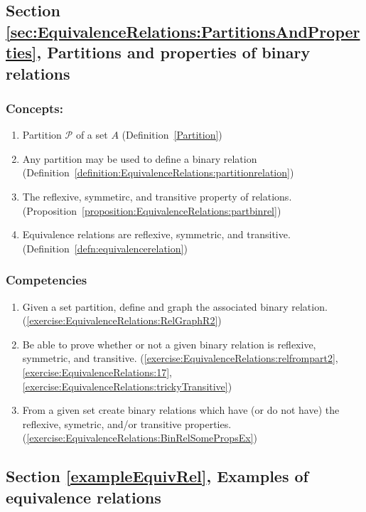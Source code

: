 \subsection*{Section \ref{sec:EquivalenceRelations:PartitionsAndProperties}, Partitions and properties of binary relations}
\subsubsection*{Concepts:}
\begin{enumerate}
\item 
Partition $\mathcal{P}$ of a set $A$ (Definition~\ref{Partition})
\item 
Any partition may be used to define a binary relation (Definition~\ref{definition:EquivalenceRelations:partitionrelation})
\item 
The reflexive, symmetirc, and transitive property of relations. (Proposition~\ref{proposition:EquivalenceRelations:partbinrel})
\item 
Equivalence relations are reflexive, symmetric, and transitive. (Definition~\ref{defn:equivalencerelation})
\end{enumerate}

\subsubsection*{Competencies}
\begin{enumerate}
\item
Given a set partition, define and graph the associated binary relation. (\ref{exercise:EquivalenceRelations:RelGraphR2})
\item
Be able to prove whether or not a given binary relation is reflexive, symmetric, and transitive. (\ref{exercise:EquivalenceRelations:relfrompart2}, \ref{exercise:EquivalenceRelations:17}, \ref{exercise:EquivalenceRelations:trickyTransitive})
\item
From a given set create binary relations which have (or do not have) the reflexive, symetric, and/or transitive properties. (\ref{exercise:EquivalenceRelations:BinRelSomePropsEx})
\end{enumerate}


\subsection*{Section \ref{exampleEquivRel}, Examples of equivalence relations}
